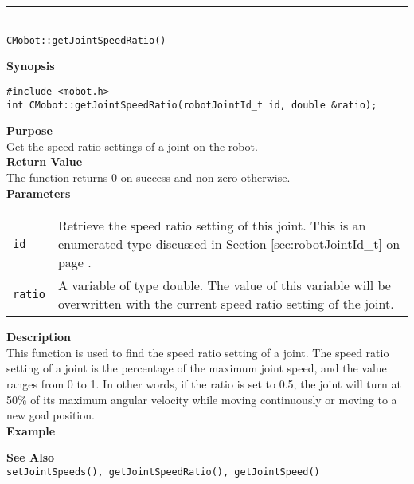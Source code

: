 \noindent
\vspace{5pt}
\rule{4.5in}{0.015in}\\
\noindent
{\LARGE \texttt{CMobot::getJointSpeedRatio()}}\\
{}

\noindent
{\bf Synopsis}
\begin{verbatim}
#include <mobot.h>
int CMobot::getJointSpeedRatio(robotJointId_t id, double &ratio);
\end{verbatim}

\noindent
{\bf Purpose}\\
Get the speed ratio settings of a joint on the robot.\\

\noindent
{\bf Return Value}\\
The function returns 0 on success and non-zero otherwise.\\

\noindent
{\bf Parameters}
\vspace{-0.1in}
\begin{description}
\item               
\begin{tabular}{p{10 mm}p{145 mm}}
\texttt{id} & Retrieve the speed ratio setting of this joint. This is an 
enumerated type discussed in Section \ref{sec:robotJointId_t} on page
\pageref{sec:robotJointId_t}.\\
\texttt{ratio} & A variable of type double. The value of this variable will
be overwritten with the current speed ratio setting of the joint.
\end{tabular}
\end{description}

\noindent
{\bf Description}\\
This function is used to find the speed ratio setting of a joint. The speed
ratio setting of a joint is the percentage of the maximum joint speed, and the
value ranges from 0 to 1. In other words, if the ratio is set to 0.5, the joint 
will turn at 50\% of its maximum angular velocity while moving continuously
or moving to a new goal position.\\

\noindent
{\bf Example}\\
\noindent

\noindent
{\bf See Also}\\
\texttt{setJointSpeeds(), getJointSpeedRatio(), getJointSpeed()}

